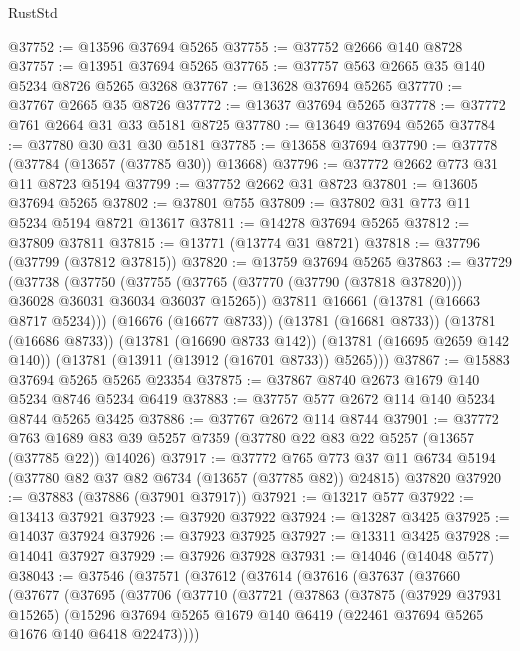 \begin{lexlean}{RustStd}
\begin{coremodule}
@37752 := @13596 @37694 @5265
@37755 := @37752 @2666 @140 @8728
@37757 := @13951 @37694 @5265
@37765 := @37757 @563 @2665 @35 @140 @5234 @8726 @5265 @3268
@37767 := @13628 @37694 @5265
@37770 := @37767 @2665 @35 @8726
@37772 := @13637 @37694 @5265
@37778 := @37772 @761 @2664 @31 @33 @5181 @8725
@37780 := @13649 @37694 @5265
@37784 := @37780 @30 @31 @30 @5181
@37785 := @13658 @37694
@37790 := @37778 (@37784 (@13657 (@37785 @30)) @13668)
@37796 := @37772 @2662 @773 @31 @11 @8723 @5194
@37799 := @37752 @2662 @31 @8723
@37801 := @13605 @37694 @5265
@37802 := @37801 @755
@37809 := @37802 @31 @773 @11 @5234 @5194 @8721 @13617
@37811 := @14278 @37694 @5265
@37812 := @37809 @37811
@37815 := @13771 (@13774 @31 @8721)
@37818 := @37796 (@37799 (@37812 @37815))
@37820 := @13759 @37694 @5265
@37863 := @37729
    (@37738
      (@37750
        (@37755 (@37765 (@37770 (@37790 (@37818 @37820))) @36028 @36031 @36034 @36037 @15265))
        @37811
        @16661
        (@13781 (@16663 @8717 @5234)))
      (@16676 (@16677 @8733))
      (@13781 (@16681 @8733))
      (@13781 (@16686 @8733))
      (@13781 (@16690 @8733 @142))
      (@13781 (@16695 @2659 @142 @140))
      (@13781 (@13911 (@13912 (@16701 @8733)) @5265)))
@37867 := @15883 @37694 @5265 @5265 @23354
@37875 := @37867 @8740 @2673 @1679 @140 @5234 @8746 @5234 @6419
@37883 := @37757 @577 @2672 @114 @140 @5234 @8744 @5265 @3425
@37886 := @37767 @2672 @114 @8744
@37901 := @37772
    @763
    @1689
    @83
    @39
    @5257
    @7359
    (@37780 @22 @83 @22 @5257 (@13657 (@37785 @22)) @14026)
@37917 := @37772
    @765
    @773
    @37
    @11
    @6734
    @5194
    (@37780 @82 @37 @82 @6734 (@13657 (@37785 @82)) @24815)
    @37820
@37920 := @37883 (@37886 (@37901 @37917))
@37921 := @13217 @577
@37922 := @13413 @37921
@37923 := @37920 @37922
@37924 := @13287 @3425
@37925 := @14037 @37924
@37926 := @37923 @37925
@37927 := @13311 @3425
@37928 := @14041 @37927
@37929 := @37926 @37928
@37931 := @14046 (@14048 @577)
@38043 := @37546
    (@37571
      (@37612
        (@37614
          (@37616
            (@37637
              (@37660
                (@37677
                  (@37695
                    (@37706
                      (@37710
                        (@37721
                          (@37863
                            (@37875
                              (@37929 @37931 @15265)
                              (@15296
                                @37694
                                @5265
                                @1679
                                @140
                                @6419
                                (@22461 @37694 @5265 @1676 @140 @6418 @22473))))

\end{coremodule}
\end{lexlean}
